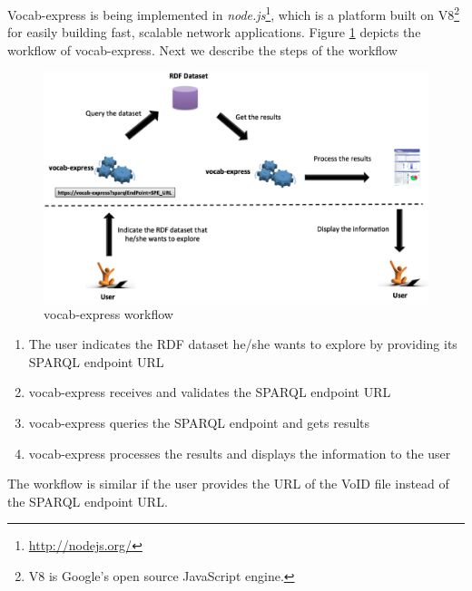 Vocab-express is being implemented in \emph{node.js}\footnote{\footnotesize \url{http://nodejs.org/}}, which is a platform built on V8\footnote{\footnotesize V8 is Google's open source JavaScript engine.} for easily building fast, scalable network applications. 
Figure \ref{fig:workflow} depicts the workflow of vocab-express. Next we describe the steps of the workflow
\vspace{-3mm}
\begin{figure}[hbt!p]
\begin{center}
\includegraphics[scale=0.22]{img/workflow.eps}
\end{center}
\label{fig:workflow} 
\caption{vocab-express workflow}
\end{figure}

\vspace{-2mm}
\begin{enumerate}
	\vspace{-0.5mm}\item The user indicates the RDF dataset he/she wants to explore by providing its SPARQL endpoint URL
	\vspace{-0.5mm}\item vocab-express receives and validates the SPARQL endpoint URL
	\vspace{-0.5mm}\item vocab-express queries the SPARQL endpoint and gets results
	\vspace{-0.5mm}\item vocab-express processes the results and displays the information to the user
\end{enumerate}
The workflow is similar if the user provides the URL of the VoID file instead of the SPARQL endpoint URL.
